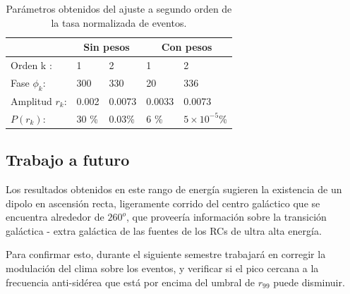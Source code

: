 		\begin{table}[H]
		\centering
			\begin{tabular}{l|l|l|l|l|}
			\cline{2-5}
			                                      & \multicolumn{2}{c|}{Sin pesos} & \multicolumn{2}{c|}{Con pesos} \\ \hline
			\multicolumn{1}{|l|}{Orden k :}       & 1            & 2               & 1       & 2                    \\ \hline
			\multicolumn{1}{|l|}{Fase $\phi_k$:}  & 300          & 330             & 20      & 336                  \\ \hline
			\multicolumn{1}{|l|}{Amplitud $r_k$:} & 0.002        & 0.0073          & 0.0033  & 0.0073               \\ \hline
			\multicolumn{1}{|l|}{$P(r_k)$:}       & 30 \%        & $0.03$\%        & 6 \%    & $5\times 10^{-5}$\%  \\ \hline
			\end{tabular}
		\caption{Parámetros obtenidos del ajuste a segundo orden de la tasa normalizada de eventos.}
		\label{table:parametros_second_order}
		\end{table}

\subsection{Trabajo a futuro}

Los resultados obtenidos en este rango de energía sugieren la existencia de un dipolo en ascensión recta, ligeramente corrido del centro galáctico que se encuentra alrededor de $260^o$, que proveería información sobre la transición galáctica - extra galáctica de las fuentes de los RCs de ultra alta energía.

Para confirmar esto, durante el siguiente semestre trabajará en corregir la modulación del clima sobre los eventos, y verificar si el pico cercana a la frecuencia anti-sidérea que está por encima del umbral de $r_{99}$ puede disminuir.